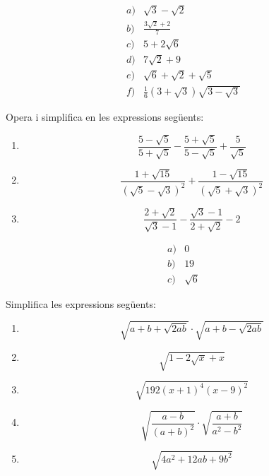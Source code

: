 \begin{indicacio}
%
\[
\begin{array}{ll}
a) & \sqrt{3}-\sqrt{2} \\ 
b) & \frac{3\sqrt{2}+2}{7} \\ 
c) & 5+2\sqrt{6} \\ 
d) & 7\sqrt{2}+9 \\ 
e) & \sqrt{6}+\sqrt{2}+\sqrt{5} \\ 
f) & \frac{1}{6}(3+\sqrt{3})\sqrt{3-\sqrt{3}}%
\end{array}%
\]
\end{indicacio}

\begin{exercici}
Opera i simplifica en les expressions següents:

\begin{enumerate}
\item[a)] 
\[
\frac{5-\sqrt{5}}{5+\sqrt{5}}-\frac{5+\sqrt{5}}{5-\sqrt{5}}+\frac{5}{\sqrt{5}%
} 
\]

\item[b)] 
\[
\frac{1+\sqrt{15}}{(\sqrt{5}-\sqrt{3})^{2}}+\frac{1-\sqrt{15}}{(\sqrt{5}+%
\sqrt{3})^{2}} 
\]

\item[c)] 
\[
\frac{2+\sqrt{2}}{\sqrt{3}-1}-\frac{\sqrt{3}-1}{2+\sqrt{2}}-2 
\]
\end{enumerate}

\end{exercici}

\begin{indicacio}
%
\[
\begin{array}{cc}
a) & 0 \\ 
b) & 19 \\ 
c) & \sqrt{6}%
\end{array}%
\]
\end{indicacio}

\begin{exercici}
Simplifica les expressions següents:

\begin{enumerate}
\item[a)] 
\[
\sqrt{a+b+\sqrt{2ab}}\cdot \sqrt{a+b-\sqrt{2ab}} 
\]

\item[b)] 
\[
\sqrt{1-2\sqrt{x}+x} 
\]

\item[c)] 
\[
\sqrt{192(x+1)^{4}(x-9)^{2}} 
\]

\item[d)] 
\[
\sqrt{\frac{a-b}{(a+b)^{2}}}\cdot \sqrt{\frac{a+b}{a^{2}-b^{2}}} 
\]

\item[e)] 
\[
\sqrt{4a^{2}+12ab+9b^{2}} 
\]
\end{enumerate}

\end{exercici}

